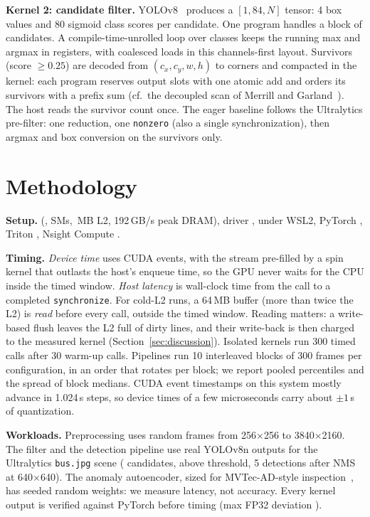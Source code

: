 \documentclass[10pt,twocolumn,letterpaper]{article}
\begin{document}
\noindent\textbf{Kernel 2: candidate filter.} YOLOv8~\cite{jocher2023yolov8,redmon2016you}
produces a $[1, 84, N]$ tensor: 4 box values and 80 sigmoid class scores per candidate. One program
handles a block of candidates. A compile-time-unrolled loop over classes keeps the running max and
argmax in registers, with coalesced loads in this channels-first layout. Survivors (score
$\geq 0.25$) are decoded from $(c_x, c_y, w, h)$ to corners and compacted in the kernel: each program
reserves output slots with one atomic add and orders its survivors with a prefix sum (cf.\ the
decoupled scan of Merrill and Garland~\cite{merrill2016single}). The host reads the survivor count
once. The eager baseline follows the Ultralytics pre-filter: one reduction, one \texttt{nonzero}
(also a single synchronization), then argmax and box conversion on the survivors only.

\section{Methodology}
\noindent\textbf{Setup.}  (,  SMs,
\,MB L2, 192\,GB/s peak DRAM), driver ,  under WSL2,
PyTorch , Triton , Nsight Compute .

\noindent\textbf{Timing.} \emph{Device time} uses CUDA events, with the stream pre-filled by a
spin kernel that outlasts the host's enqueue time, so the GPU never waits for the CPU inside the
timed window. \emph{Host latency} is wall-clock time from the call to a completed
\texttt{synchronize}. For cold-L2 runs, a 64\,MB buffer (more than twice the L2) is \emph{read}
before every call, outside the timed window. Reading matters: a write-based flush leaves the L2
full of dirty lines, and their write-back is then charged to the measured kernel
(Section~\ref{sec:discussion}). Isolated kernels run 300 timed calls after 30 warm-up
calls. Pipelines run 10 interleaved blocks of 300 frames per configuration, in an order that
rotates per block; we report pooled percentiles and the spread of block medians. CUDA event
timestamps on this system mostly advance in 1.024\,\textmu s steps, so device times of a few
microseconds carry about $\pm1$\,\textmu s of quantization.

\noindent\textbf{Workloads.} Preprocessing uses random frames from 256$\times$256 to
3840$\times$2160. The filter and the detection pipeline use real YOLOv8n outputs for the
Ultralytics \texttt{bus.jpg} scene ( candidates,  above
threshold, 5 detections after NMS at 640$\times$640). The anomaly autoencoder, sized for MVTec-AD-style inspection~\cite{bergmann2019mvtec}, has
seeded random weights: we measure latency, not accuracy. Every kernel output is verified
against PyTorch before timing (max FP32 deviation ).
\end{document}
